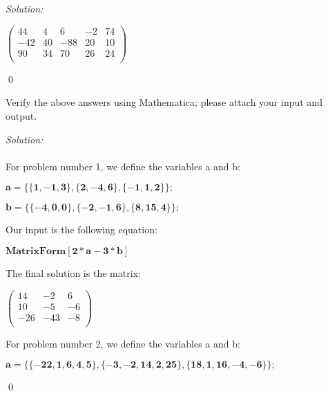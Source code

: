\documentclass[12pt]{article}
\newenvironment{problem}[2][Problem]{\begin{trivlist}
\item[\hskip \labelsep {\bfseries #1}\hskip \labelsep {\bfseries #2.}]}{\end{trivlist}}
\newenvironment{sol}
    {\emph{Solution:}
    }
    {
    \qed
    }
\begin{document}
\begin{sol}
\begin{doublespace}
\noindent\(\left(
\begin{array}{ccccc}
 44 & 4 & 6 & -2 & 74 \\
 -42 & 40 & -88 & 20 & 10 \\
 90 & 34 & 70 & 26 & 24 \\
\end{array}
\right)\)
\end{doublespace}
\end{sol}



\begin{problem}{II}
Verify the above answers using Mathematica; please attach your input and output.
\end{problem}
\begin{sol}\\ \\
For problem number 1, we define the variables a and b:

\begin{doublespace}
\noindent\(\pmb{a=\{\{1,-1,3\},\{2,-4,6\},\{-1,1,2\}\};}\)
\end{doublespace}

\begin{doublespace}
\noindent\(\pmb{b=\{\{-4,0,0\},\{-2,-1,6\},\{8,15,4\}\};}\)
\end{doublespace}

Our input is the following equation:

\begin{doublespace}
\noindent\(\pmb{\text{MatrixForm}[2*a-3*b]}\)
\end{doublespace}

The final solution is the matrix:

\begin{doublespace}
\noindent\(\left(
\begin{array}{ccc}
 14 & -2 & 6 \\
 10 & -5 & -6 \\
 -26 & -43 & -8 \\
\end{array}
\right)\)
\end{doublespace}
For problem number 2, we define the variables a and b:
\begin{doublespace}
\noindent\(\pmb{a=\{\{-22,1,6,4,5\},\{-3,-2,14,2,25\},\{18,1,16,-4,-6\}\};}\)
\end{doublespace}


\end{sol}
\end{document}

